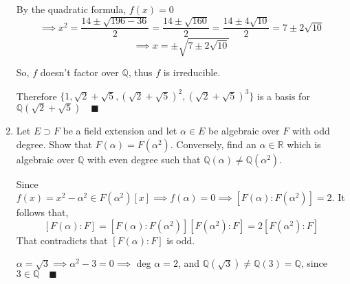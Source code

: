 \documentclass{article}
\newcommand\Q{\mathbb{Q}}
\newcommand\R{\mathbb{R}}
\begin{document}
\begin{enumerate}
  By the quadratic formula, $f(x) = 0$
  \[\implies x^2 = \frac{14 \pm\sqrt{196 -36}}{2} = \frac{14\pm
      \sqrt{160}}{2} = \frac{14\pm
      4\sqrt{10}}{2} = 7 \pm 2{\sqrt{10}}\]
  \[\implies x = \pm \sqrt{7 \pm 2{\sqrt{10}}}\]

    So, $f$ doesn't factor over $\Q$, thus $f$ is irreducible.

    Therefore $\{1, \sqrt{2}+\sqrt{5}, (\sqrt{2}+\sqrt{5})^2,
    (\sqrt{2}+\sqrt{5})^3\}$ is a basis for
    $\Q(\sqrt{2}+\sqrt{5})\quad \blacksquare$

\item Let $E \supset F$ be a field extension  and let $\alpha \in E$
  be algebraic over $F$ with odd degree. Show that $F(\alpha) =
  F(\alpha^2)$. Conversely, find an $\alpha \in \R$ which is algebraic
  over $\Q$ with even degree such that $\Q(\alpha) \not=
  \Q(\alpha^2)$.


  Since $f(x) = x^2-\alpha^2 \in F(\alpha^2)[x] \implies f(\alpha) =
  0\implies [F(\alpha):F(\alpha^2)] = 2$. It follows that, \[[F(\alpha):F] =
    [F(\alpha):F(\alpha^2)] [F(\alpha^2):F] =2[F(\alpha^2):F]\]
  That
  contradicts that $[F(\alpha):F]$ is odd.

  $\alpha = \sqrt{3} \implies \alpha^2-3 = 0\implies$ deg $\alpha =
  2$, and $\Q(\sqrt{3})\neq \Q(3) = \Q$, since $3\in \Q \quad \blacksquare$

\end{enumerate}
\end{document}
